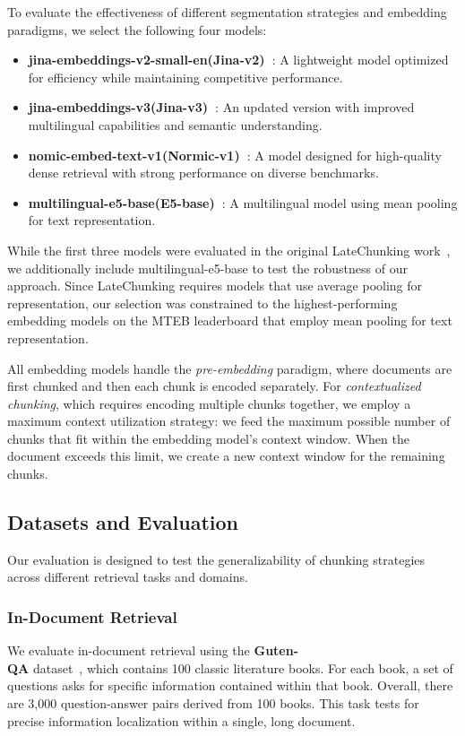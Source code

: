 To evaluate the effectiveness of different segmentation strategies and embedding paradigms, we select the following four models:
\begin{itemize}
	\item \textbf{jina-embeddings-v2-small-en(Jina-v2)~\cite{jina2}}: A lightweight model optimized for efficiency while maintaining competitive performance.
	
	\item \textbf{jina-embeddings-v3(Jina-v3)~\cite{jina3}}: An updated version with improved multilingual capabilities and semantic understanding.
	
	\item \textbf{nomic-embed-text-v1(Normic-v1)~\cite{nomic}}: A model designed for high-quality dense retrieval with strong performance on diverse benchmarks.
	
	\item \textbf{multilingual-e5-base(E5-base)~\cite{e5}}: A multilingual model using mean pooling for text representation.
\end{itemize}

While the first three models were evaluated in the original LateChunking work~\cite{latechunking2024}, we additionally include multilingual-e5-base to test the robustness of our approach. Since LateChunking requires models that use average pooling for representation, our selection was constrained to the highest-performing embedding models on the MTEB leaderboard that employ mean pooling for text representation.

All embedding models handle the \textit{pre-embedding} paradigm, where documents are first chunked and then each chunk is encoded separately. For \textit{contextualized chunking}, which requires encoding multiple chunks together, we employ a maximum context utilization strategy: we feed the maximum possible number of chunks that fit within the embedding model's context window. When the document exceeds this limit, we create a new context window for the remaining chunks.

\subsection{Datasets and Evaluation}
Our evaluation is designed to test the generalizability of chunking strategies across different retrieval tasks and domains.

\subsubsection{In-Document Retrieval}
We evaluate in-document retrieval using the \textbf{Guten-\\QA} dataset~\cite{duarte_lumberchunker_2024}, which contains 100 classic literature books. For each book, a set of questions asks for specific information contained within that book. Overall, there are 3,000 question-answer pairs derived from 100 books. This task tests for precise information localization within a single, long document.

